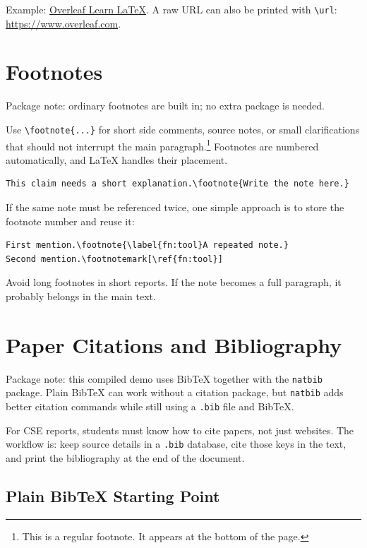 \documentclass[11pt,a4paper]{article}
\begin{document}
Example: \href{https://www.overleaf.com/learn/latex/Main_Page}{Overleaf Learn
LaTeX}. A raw URL can also be printed with \verb|\url|:
\url{https://www.overleaf.com}.

\section{Footnotes}

Package note: ordinary footnotes are built in; no extra package is needed.

Use \verb|\footnote{...}| for short side comments, source notes, or small
clarifications that should not interrupt the main paragraph.\footnote{This is a
regular footnote. It appears at the bottom of the page.} Footnotes are numbered
automatically, and LaTeX handles their placement.

\begin{verbatim}
This claim needs a short explanation.\footnote{Write the note here.}
\end{verbatim}

If the same note must be referenced twice, one simple approach is to store the
footnote number and reuse it:

\begin{verbatim}
First mention.\footnote{\label{fn:tool}A repeated note.}
Second mention.\footnotemark[\ref{fn:tool}]
\end{verbatim}

Avoid long footnotes in short reports. If the note becomes a full paragraph,
it probably belongs in the main text.

\section{Paper Citations and Bibliography}

Package note: this compiled demo uses BibTeX together with the
\texttt{natbib} package. Plain BibTeX can work without a citation package, but
\texttt{natbib} adds better citation commands while still using a
\texttt{.bib} file and BibTeX.

For CSE reports, students must know how to cite papers, not just websites. The
workflow is: keep source details in a \texttt{.bib} database, cite those keys
in the text, and print the bibliography at the end of the document.

\subsection{Plain BibTeX Starting Point}
\end{document}

